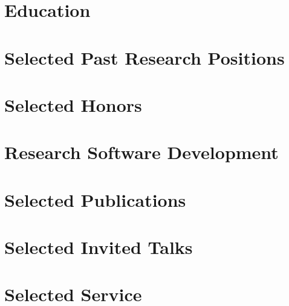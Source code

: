 


\thispagestyle{empty}					%
\pagestyle{fancy}			 		%

\vspace*{-1cm}
\centering 


\vspace{-3mm}
\section{Education}
\vspace{-1mm}
\def\edsep{-2.7mm}


\vspace{-2.5mm}
\section{Selected Past Research Positions}


\vspace{-2.5mm}
\section{Selected Honors}
\vspace{-1mm}


\vspace{-3mm}
\section{Research Software Development}
\vspace{-1mm}


\vspace{-2.5mm}
\section{Selected Publications}


\section{Selected Invited Talks}
\def\talksep{-2.5mm}
\def\talkyearsep{-1mm}


\vspace{-2.5mm}
\section{Selected Service}



